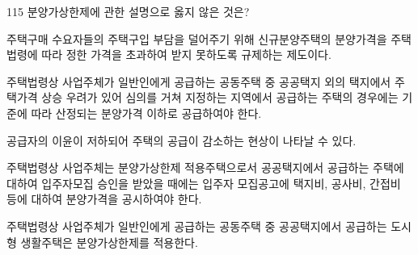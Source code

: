 \begin{question}{115}
분양가상한제에 관한 설명으로 옳지 않은 것은?
\begin{choices}
  \item 주택구매 수요자들의 주택구입 부담을 덜어주기 위해 신규분양주택의 분양가격을 주택법령에 따라 정한 가격을 초과하여 받지 못하도록 규제하는 제도이다.
  \item 주택법령상 사업주체가 일반인에게 공급하는 공동주택 중 공공택지 외의 택지에서 주택가격 상승 우려가 있어 심의를 거쳐 지정하는 지역에서 공급하는 주택의 경우에는 기준에 따라 산정되는 분양가격 이하로 공급하여야 한다.
  \item 공급자의 이윤이 저하되어 주택의 공급이 감소하는 현상이 나타날 수 있다.
  \item 주택법령상 사업주체는 분양가상한제 적용주택으로서 공공택지에서 공급하는 주택에 대하여 입주자모집 승인을 받았을 때에는 입주자 모집공고에 택지비, 공사비, 간접비 등에 대하여 분양가격을 공시하여야 한다.
  \item 주택법령상 사업주체가 일반인에게 공급하는 공동주택 중 공공택지에서 공급하는 도시형 생활주택은 분양가상한제를 적용한다.
\end{choices}
\end{question}
